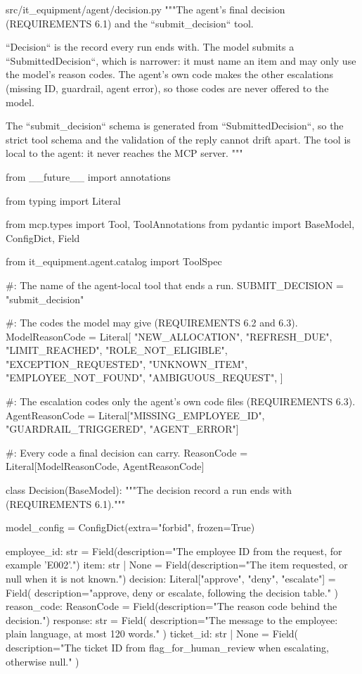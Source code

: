 \documentclass[11pt,letterpaper]{article}
\renewcommand{\_}{\textunderscore\allowbreak}
\begin{document}
\begin{codebox}{src/it_equipment/agent/decision.py}
"""The agent's final decision (REQUIREMENTS 6.1) and the ``submit_decision`` tool.

``Decision`` is the record every run ends with. The model submits a ``SubmittedDecision``,
which is narrower: it must name an item and may only use the model's reason codes. The agent's
own code makes the other escalations (missing ID, guardrail, agent error), so those codes are
never offered to the model.

The ``submit_decision`` schema is generated from ``SubmittedDecision``, so the strict tool
schema and the validation of the reply cannot drift apart. The tool is local to the agent: it
never reaches the MCP server.
"""

from __future__ import annotations

from typing import Literal

from mcp.types import Tool, ToolAnnotations
from pydantic import BaseModel, ConfigDict, Field

from it_equipment.agent.catalog import ToolSpec

#: The name of the agent-local tool that ends a run.
SUBMIT_DECISION = "submit_decision"

#: The codes the model may give (REQUIREMENTS 6.2 and 6.3).
ModelReasonCode = Literal[
    "NEW_ALLOCATION",
    "REFRESH_DUE",
    "LIMIT_REACHED",
    "ROLE_NOT_ELIGIBLE",
    "EXCEPTION_REQUESTED",
    "UNKNOWN_ITEM",
    "EMPLOYEE_NOT_FOUND",
    "AMBIGUOUS_REQUEST",
]

#: The escalation codes only the agent's own code files (REQUIREMENTS 6.3).
AgentReasonCode = Literal["MISSING_EMPLOYEE_ID", "GUARDRAIL_TRIGGERED", "AGENT_ERROR"]

#: Every code a final decision can carry.
ReasonCode = Literal[ModelReasonCode, AgentReasonCode]


class Decision(BaseModel):
    """The decision record a run ends with (REQUIREMENTS 6.1)."""

    model_config = ConfigDict(extra="forbid", frozen=True)

    employee_id: str = Field(description="The employee ID from the request, for example 'E002'.")
    item: str | None = Field(description="The item requested, or null when it is not known.")
    decision: Literal["approve", "deny", "escalate"] = Field(
        description="approve, deny or escalate, following the decision table."
    )
    reason_code: ReasonCode = Field(description="The reason code behind the decision.")
    response: str = Field(
        description="The message to the employee: plain language, at most 120 words."
    )
    ticket_id: str | None = Field(
        description="The ticket ID from flag_for_human_review when escalating, otherwise null."
    )



\end{codebox}
\end{document}
